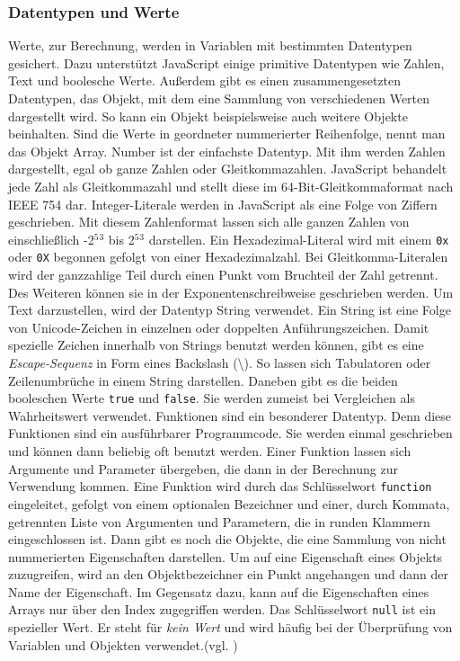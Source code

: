 \subsubsection{Datentypen und Werte} Werte, zur Berechnung, werden in Variablen mit bestimmten Datentypen gesichert. Dazu unterstützt JavaScript einige primitive Datentypen wie Zahlen, Text und boolesche Werte. Außerdem gibt es einen zusammengesetzten Datentypen, das Objekt, mit dem eine Sammlung von verschiedenen Werten dargestellt wird. So kann ein Objekt beispielsweise auch weitere Objekte beinhalten. Sind die Werte in geordneter nummerierter Reihenfolge, nennt man das Objekt Array. Number ist der einfachste Datentyp. Mit ihm werden Zahlen dargestellt, egal ob ganze Zahlen oder Gleitkommazahlen. JavaScript behandelt jede Zahl als Gleitkommazahl und stellt diese im 64-Bit-Gleitkommaformat nach IEEE 754 dar. Integer-Literale werden in JavaScript als eine Folge von Ziffern geschrieben. Mit diesem Zahlenformat lassen sich alle ganzen Zahlen von einschließlich -2$^5$$^3$ bis 2$^5$$^3$ darstellen. Ein Hexadezimal-Literal wird mit einem \texttt{0x} oder \texttt{0X} begonnen gefolgt von einer Hexadezimalzahl. Bei Gleitkomma-Literalen wird der ganzzahlige Teil durch einen Punkt vom Bruchteil der Zahl getrennt. Des Weiteren können sie in der Exponentenschreibweise geschrieben werden. Um Text darzustellen, wird der Datentyp String verwendet. Ein String ist eine Folge von Unicode-Zeichen in einzelnen oder doppelten Anführungszeichen. Damit spezielle Zeichen innerhalb von Strings benutzt werden können, gibt es eine \textit{Escape-Sequenz} in Form eines Backslash (\textbackslash). So lassen sich Tabulatoren oder Zeilenumbrüche in einem String darstellen. Daneben gibt es die beiden booleschen Werte \texttt{true} und \texttt{false}. Sie werden zumeist bei Vergleichen als Wahrheitswert verwendet. Funktionen sind ein besonderer Datentyp. Denn diese Funktionen sind ein ausführbarer Programmcode. Sie werden einmal geschrieben und können dann beliebig oft benutzt werden. Einer Funktion lassen sich Argumente und Parameter übergeben, die dann in der Berechnung zur Verwendung kommen. Eine Funktion wird durch das Schlüsselwort \texttt{function} eingeleitet, gefolgt von einem optionalen Bezeichner und einer, durch Kommata, getrennten Liste von Argumenten und Parametern, die in runden Klammern eingeschlossen ist. Dann gibt es noch die Objekte, die eine Sammlung von nicht nummerierten Eigenschaften darstellen. Um auf eine Eigenschaft eines Objekts zuzugreifen, wird an den Objektbezeichner ein Punkt angehangen und dann der Name der Eigenschaft. Im Gegensatz dazu, kann auf die Eigenschaften eines Arrays nur über den Index zugegriffen werden. Das Schlüsselwort \texttt{null} ist ein spezieller Wert. Er steht für \textit{kein Wert} und wird häufig bei der Überprüfung von Variablen und Objekten verwendet.(vgl. \cite[S.22ff]{FlanJava2007})
	
